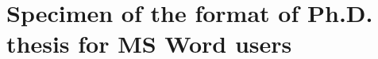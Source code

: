 \documentclass [12pt,openright,twoside]{report}
\def\thetable{\arabic{chapter}.\arabic{table}}
\begin{document}

\baselineskip   17pt %
\cleardoublepage
{}
\setcounter{page}{1}
\cleardoublepage



%

\cleardoublepage


%


%

\cleardoublepage

%

\cleardoublepage

%

\cleardoublepage

%
%
\cleardoublepage

%
\cleardoublepage

%
\cleardoublepage

\setcounter{page}{1}
\cleardoublepage
\begin{singlespace}
\cleardoublepage

\medskip


%
%
%
%
\cleardoublepage
\end{singlespace}

\appendix
\renewcommand{\thechapter}{\Alph{chapter}}
\renewcommand{\thetable}{\Alph{chapter}.\arabic{table}}
\chapter{Specimen of the format of Ph.D. thesis for MS Word users}
%

\clearpage
\newpage
\end{document}
